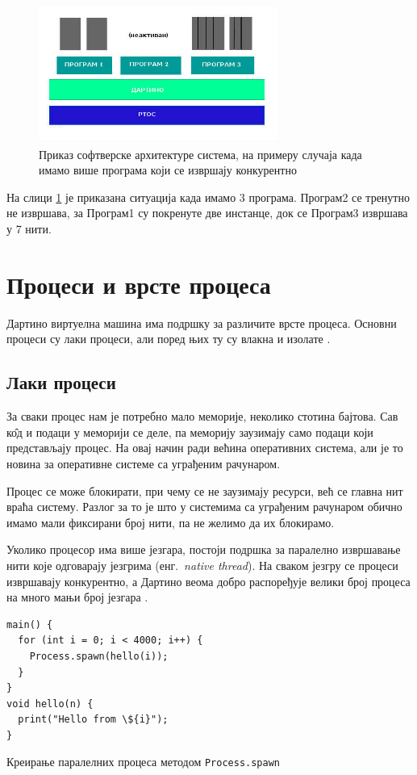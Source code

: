 \documentclass[12pt,oneside]{memoir}
\begin{document}
\begin{figure}[!ht]
  \centering
  \includegraphics[width=0.7\textwidth]{arhitektura.jpg}
  \caption{Приказ софтверске архитектуре система, на примеру случаја када имамо више програма који се извршају конкурентно}
  \label{fig:model}
\end{figure}
На слици \ref{fig:model} је приказана ситуација када имамо 3 програма. Програм2 се тренутно не извршава, за Програм1 су покренуте две инстанце, док се Програм3  извршава у 7 нити.

\section{Процеси и врсте процеса}
\label{procesi}
Дартино виртуелна машина има подршку за различите врсте процеса. Основни процеси су лаки процеси, али поред њих ту су влакна и изолате \cite{Dartino, procesi_i_izolate, korutine_i_vlakna}.
\subsection{Лаки процеси}
\label{laki_procesi}
За сваки процес нам је потребно мало меморије, неколико стотина бајтова. Сав к\^{о}д и подаци у меморији се деле, па меморију заузимају само подаци који представљају процес. На овај начин ради већина оперативних система, али је то новина за оперативне системе са уграђеним рачунаром.

Процес се може блокирати, при чему се не заузимају ресурси, већ се главна нит враћа систему. Разлог за то је што у системима са уграђеним рачунаром обично имамо мали фиксирани број нити, па не желимо да их блокирамо. 

Уколико процесор има више језгара, постоји подршка за паралелно извршавање нити које одговарају језгрима (енг.~\textit{native thread}). На сваком језгру се процеси извршавају конкурентно, а Дартино веома добро распоређује велики број процеса на много мањи број језгара \cite{Dartino}.

\begin{listing}
\begin{verbatim}
main() {
  for (int i = 0; i < 4000; i++) {
    Process.spawn(hello(i));
  }
}
void hello(n) {
  print("Hello from \${i}");
}
\end{verbatim}
\caption{Креирање паралелних процеса методом \texttt{Process.spawn}}
\label{paralelniprocesi}
\end{listing}
\end{document}
